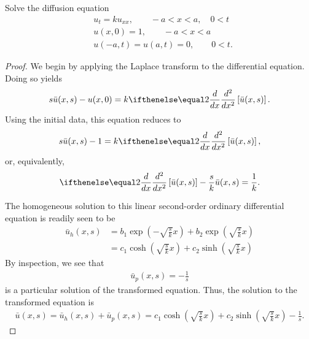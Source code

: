 \begin{problem}{4.43}
  Solve the diffusion equation
  \begin{align*}
    & u_t = k u_{xx}, \qquad -a < x < a, \quad 0 < t \\
    & u(x, 0) = 1, \qquad -a < x < a \\
    & u(-a, t) = u(a, t) = 0, \qquad 0 < t.
  \end{align*}
\end{problem}

\begin{proof}
  We begin by applying the Laplace transform to the differential equation. Doing so yields
  \begin{align*}
    s\bar{u}(x, s) - u(x, 0) = k \der{x}{2}\left[\bar{u}(x, s)\right].
  \end{align*}
  Using the initial data, this equation reduces to
  \begin{align*}
    s\bar{u}(x, s) - 1 = k \der{x}{2}\left[\bar{u}(x, s)\right],
  \end{align*}
  or, equivalently,
  \begin{align*}
    \der{x}{2}\left[\bar{u}(x, s)\right] - \frac{s}{k}\bar{u}(x, s) = \frac{1}{k}.
  \end{align*}

  The homogeneous solution to this linear second-order ordinary differential equation is readily seen to be
  \begin{align*}
    \bar{u}_h(x, s) &= b_1 \exp\left(-\sqrt{\frac{s}{k}} x\right) + b_2 \exp\left(\sqrt{\frac{s}{k}} x\right) \\
    &=c_1 \cosh\left(\sqrt{\frac{s}{k}} x\right) + c_2 \sinh\left(\sqrt{\frac{s}{k}} x\right)
  \end{align*}
  By inspection, we see that
  \begin{align*}
    \bar{u}_p(x, s) = -\frac{1}{s}
  \end{align*}
  is a particular solution of the transformed equation. Thus, the solution to the transformed equation is
  \begin{align*}
    \bar{u}(x, s) = \bar{u}_h(x, s) + \bar{u}_p(x,s) =      c_1 \cosh\left(\sqrt{\frac{s}{k}} x\right) + c_2 \sinh\left(\sqrt{\frac{s}{k}} x\right) -\frac{1}{s}.
  \end{align*}


\end{proof}
